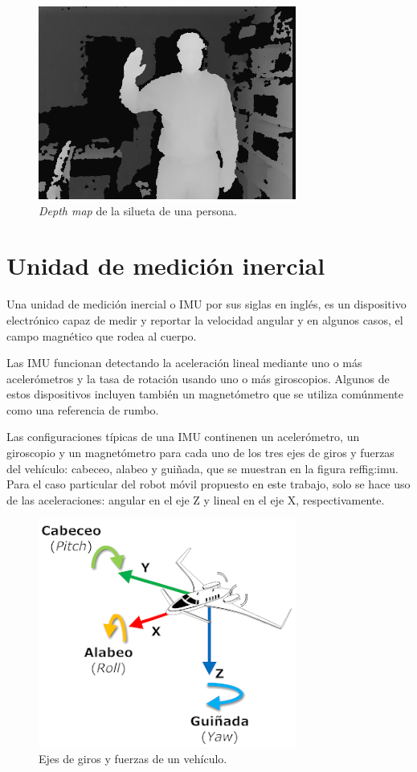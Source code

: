 \begin{figure}[ht]
    \centering
    \includegraphics[scale=2.0]{./Figures/depth_map.png}
    \caption{\textit{Depth map} de la silueta de una persona.}
    \label{fig:depthMap}
\end{figure}

\section{Unidad de medición inercial}

Una unidad de medición inercial o IMU por sus siglas en inglés, es un dispositivo electrónico capaz de medir y reportar la velocidad angular y en algunos casos, el campo magnético que rodea al cuerpo.

Las IMU funcionan detectando la aceleración lineal mediante uno o más acelerómetros y la tasa de rotación usando uno o más giroscopios. Algunos de estos dispositivos incluyen también un magnetómetro que se utiliza comúnmente como una referencia de rumbo.

Las configuraciones típicas de una IMU continenen un acelerómetro, un giroscopio y un magnetómetro para cada uno de los tres ejes de giros y fuerzas del vehículo: cabeceo, alabeo y guiñada, que se muestran en la figura ref{fig:imu}. Para el caso particular del robot móvil propuesto en este trabajo, solo se hace uso de las aceleraciones: angular en el eje Z y lineal en el eje X, respectivamente.

\begin{figure}[ht]
    \centering
    \includegraphics[scale=1.5]{./Figures/imu.png}
    \caption{Ejes de giros y fuerzas de un vehículo.\protect\footnotemark}
    \label{fig:girosYFuerzas}
\end{figure}

